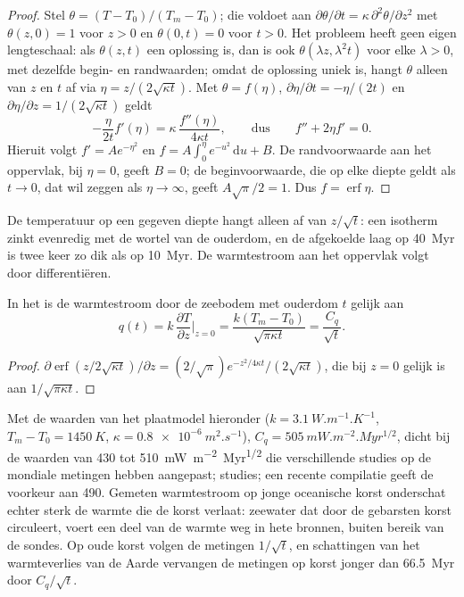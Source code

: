\begin{proof}
Stel $\theta = (T - T_0)/(T_m - T_0)$; die voldoet aan $\partial\theta/\partial t =
\kappa\,\partial^2\theta/\partial z^2$ met $\theta(z, 0) = 1$ voor $z > 0$ en
$\theta(0, t) = 0$ voor $t > 0$. Het probleem heeft geen eigen lengteschaal:
als $\theta(z, t)$ een oplossing is, dan is ook $\theta(\lambda z, \lambda^2t)$ voor elke
$\lambda > 0$, met dezelfde begin- en randwaarden; omdat de oplossing uniek is, hangt
$\theta$ alleen van $z$ en $t$ af via $\eta = z/(2\sqrt{\kappa
t})$. Met $\theta = f(\eta)$, $\partial\eta/\partial t = -\eta/(2t)$ en
$\partial\eta/\partial z = 1/(2\sqrt{\kappa t})$ geldt
\[
  -\frac{\eta}{2t}f'(\eta) = \kappa\,\frac{f''(\eta)}{4\kappa t},
  \qquad\text{dus}\qquad f'' + 2\eta f' = 0 .
\]
Hieruit volgt $f' = Ae^{-\eta^2}$ en $f = A\int_0^\eta e^{-u^2}\,\mathrm du + B$. De
randvoorwaarde aan het oppervlak, bij $\eta = 0$, geeft $B = 0$; de
beginvoorwaarde, die op elke diepte geldt als $t \to 0$, dat wil zeggen als
$\eta \to \infty$, geeft $A\sqrt\pi/2 = 1$. Dus $f = \operatorname{erf}\eta$.
\end{proof}

De temperatuur op een gegeven diepte hangt alleen af van $z/\sqrt t$: een isotherm zinkt
evenredig met de wortel van de ouderdom, en de afgekoelde laag op \qty{40}{Myr} is twee
keer zo dik als op \qty{10}{Myr}. De warmtestroom aan het oppervlak volgt door differentiëren.

\begin{proposition}\label{prop:b3:lithosphere-thermal-models:heat-flow}
In het  is de warmtestroom door de zeebodem met ouderdom $t$
gelijk aan
\[
  q(t) = k\,\frac{\partial T}{\partial z}\Big|_{z=0}
  = \frac{k(T_m - T_0)}{\sqrt{\pi\kappa t}} = \frac{C_q}{\sqrt t} .
\]
\end{proposition}

\begin{proof}
$\partial\operatorname{erf}(z/2\sqrt{\kappa t})/\partial z = (2/\sqrt\pi)
e^{-z^2/4\kappa t}/(2\sqrt{\kappa t})$, die bij $z = 0$ gelijk is aan $1/\sqrt{\pi\kappa
t}$.
\end{proof}

Met de waarden van het plaatmodel hieronder ($k = \qty{3.1}{W.m^{-1}.K^{-1}}$,
$T_m - T_0 = \qty{1450}{K}$, $\kappa = \qty{0.8e-6}{m^2.s^{-1}}$), $C_q =
\qty{505}{mW.m^{-2}.Myr^{1/2}}$, dicht bij de waarden van 430 tot
\qty{510}{mW.m^{-2}.Myr^{1/2}} die verschillende studies op de mondiale metingen hebben aangepast;
studies; een recente compilatie geeft de voorkeur aan \num{490}. Gemeten warmtestroom op jonge
oceanische korst onderschat echter sterk de warmte die de korst verlaat:
zeewater dat door de gebarsten korst circuleert, voert een deel van de warmte weg
in hete bronnen, buiten bereik van de sondes. Op oude korst volgen de metingen
$1/\sqrt t$, en schattingen van het warmteverlies van de Aarde vervangen de
metingen op korst jonger dan \qty{66.5}{Myr} door $C_q/\sqrt t$.

